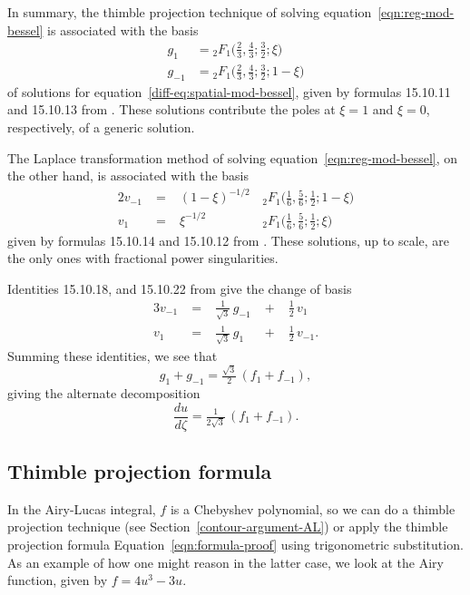 \documentclass{article}
\theoremstyle{definition}
\theoremstyle{plain}
\begin{document}
In summary, the thimble projection technique of solving equation~\eqref{eqn:reg-mod-bessel} is associated with the basis
\begin{align*}
g_{1} & = {}_2F_1\big(\tfrac{2}{3}, \tfrac{4}{3}; \tfrac{3}{2}; \xi\big) \\
g_{-1} & = {}_2F_1\big(\tfrac{2}{3}, \tfrac{4}{3}; \tfrac{3}{2}; 1-\xi\big)
\end{align*}
of solutions for equation~\eqref{diff-eq:spatial-mod-bessel}, given by formulas 15.10.11 and 15.10.13 from \cite{dlmf}. These solutions contribute the poles at $\xi = 1$ and $\xi = 0$, respectively, of a generic solution.

The Laplace transformation method of solving equation~\eqref{eqn:reg-mod-bessel}, on the other hand, is associated with the basis
\begin{alignat*}{2}
v_{-1} &\;=\;& (1-\xi)^{-1/2} & \, {}_2F_1\big(\tfrac{1}{6}, \tfrac{5}{6}; \tfrac{1}{2}; 1-\xi\big) \\
v_1 &\;=\:& \xi^{-1/2} & \, {}_2F_1\big(\tfrac{1}{6}, \tfrac{5}{6}; \tfrac{1}{2}; \xi\big)
\end{alignat*}
given by formulas 15.10.14 and 15.10.12 from \cite{dlmf}. These solutions, up to scale, are the only ones with fractional power singularities.

Identities 15.10.18, and 15.10.22 from \cite{dlmf} give the change of basis
\begin{alignat*}{3}
v_{-1} &\;=\;&\tfrac{1}{\sqrt{3}}\,g_{-1} &\;+\;& \tfrac{1}{2}\,v_1 \\
v_1 &\;=\;& \tfrac{1}{\sqrt{3}}\,g_{1} &\;+\;& \tfrac{1}{2}\,v_{-1}.
\end{alignat*}
Summing these identities, we see that
\[ g_1 + g_{-1} = \tfrac{\sqrt{3}}{2}\,(f_1 + f_{-1}), \]
giving the alternate decomposition
\[ \frac{du}{d\zeta} = \tfrac{1}{2\sqrt{3}}\,(f_1 + f_{-1}). \]

\subsection{Thimble projection formula}

In the Airy-Lucas integral, $f$ is a Chebyshev polynomial, so we can do a thimble projection technique (see Section~\ref{contour-argument-AL}) or apply the thimble projection formula Equation~\eqref{eqn:formula-proof} using trigonometric substitution. As an example of how one might reason in the latter case, we look at the Airy function, given by $f = 4u^3-3u$.
\end{document}
